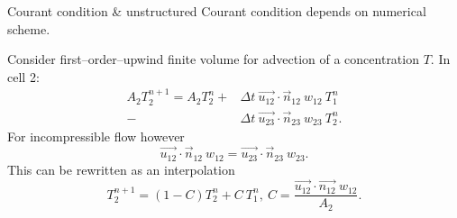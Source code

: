 \documentclass[12pt]{beamer}
\begin{document}
\begin{frame}{Courant condition \& unstructured}
  Courant condition depends on numerical scheme.
  \begin{example}
    \small
    \begin{minipage}{0.7\textwidth}
      Consider first--order--upwind finite volume for advection
      of a concentration $T$. In cell 2:
      \begin{align*}
        A_2 T^{n+1}_2 = A_2 T^n_2
        +&
        \Delta t~\vec{u_{12}}\cdot\vec n_{12}~w_{12}~T^n_1 \\
        -& \Delta t~\vec{u_{23}}\cdot\vec n_{23}~w_{23}~T^n_2.
      \end{align*}
      For incompressible flow however
      \begin{equation*}
        \vec{u_{12}}\cdot\vec n_{12}~w_{12} = \vec{u_{23}}\cdot\vec
        n_{23}~w_{23}.
      \end{equation*}
      This can be rewritten as an interpolation
      \begin{equation*}
        T^{n+1}_2 = \left(1-C\right) T^n_2 + C~T^n_1,~
          C = \frac{\vec{u_{12}}\cdot\vec{n_{12}}~w_{12}}{A_2}.
      \end{equation*}
    \end{minipage}%
    \begin{minipage}{0.3\textwidth}

\end{minipage}
\end{example}
\end{frame}
\end{document}
